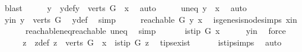 \begin{isabellebody}
\ blast\isanewline
\ \ \isamarkupfalse%
\ \isamarkupfalse%
\ y\ \ y{\isacharunderscore}{\kern0pt}def{\isacharcolon}{\kern0pt}{\isachardoublequoteopen}y\ {\isasymin}\ {\isacharparenleft}{\kern0pt}verts\ G{\isacharparenright}{\kern0pt}\ {\isacharminus}{\kern0pt}\ {\isacharbraceleft}{\kern0pt}x{\isacharbraceright}{\kern0pt}{\isachardoublequoteclose}\ \isamarkupfalse%
\ auto\isanewline
\ \ \isamarkupfalse%
\ \isamarkupfalse%
\ uneq{\isacharcolon}{\kern0pt}\ {\isachardoublequoteopen}y\ {\isasymnoteq}\ x{\isachardoublequoteclose}\ \isamarkupfalse%
\ auto\isanewline
\ \ \isamarkupfalse%
\ y{\isacharunderscore}{\kern0pt}in{\isacharcolon}{\kern0pt}\ {\isachardoublequoteopen}y\ {\isasymin}\ {\isacharparenleft}{\kern0pt}verts\ G{\isacharparenright}{\kern0pt}{\isachardoublequoteclose}\ \isamarkupfalse%
\ y{\isacharunderscore}{\kern0pt}def\ \isamarkupfalse%
\ simp\isanewline
\ \ \isamarkupfalse%
\ \isamarkupfalse%
\ {\isachardoublequoteopen}reachable{}\ G\ y\ x{\isachardoublequoteclose}\ \isamarkupfalse%
\ is{\isacharunderscore}{\kern0pt}genesis{\isacharunderscore}{\kern0pt}node{\isachardot}{\kern0pt}simps\ x{\isacharunderscore}{\kern0pt}in\isanewline
\ \ \ \ \ \ reachable{\isacharunderscore}{\kern0pt}neq{\isacharunderscore}{\kern0pt}reachable{}\ uneq\ \isamarkupfalse%
\ simp\isanewline
\ \ \isamarkupfalse%
\ \isamarkupfalse%
\ {\isachardoublequoteopen}{\isasymnot}\ is{\isacharunderscore}{\kern0pt}tip\ G\ x{\isachardoublequoteclose}\isanewline
\ \ \ \ \isamarkupfalse%
\ y{\isacharunderscore}{\kern0pt}in\ \isamarkupfalse%
\ force\ \isanewline
\ \ \isamarkupfalse%
\ \isamarkupfalse%
\ z\ \ z{\isacharunderscore}{\kern0pt}def{\isacharcolon}{\kern0pt}\ {\isachardoublequoteopen}z\ {\isasymin}\ {\isacharparenleft}{\kern0pt}verts\ G{\isacharparenright}{\kern0pt}\ {\isacharminus}{\kern0pt}\ {\isacharbraceleft}{\kern0pt}x{\isacharbraceright}{\kern0pt}\ {\isasymand}\ is{\isacharunderscore}{\kern0pt}tip\ G\ z{\isachardoublequoteclose}\ \isamarkupfalse%
\ tips{\isacharunderscore}{\kern0pt}exist\isanewline
\ \ \ \ \ \ is{\isacharunderscore}{\kern0pt}tip{\isachardot}{\kern0pt}simps\ \isamarkupfalse%
\ auto\isanewline
\ \ \isamarkupfalse%
\ \isamarkupfalse%

\end{isabellebody}

